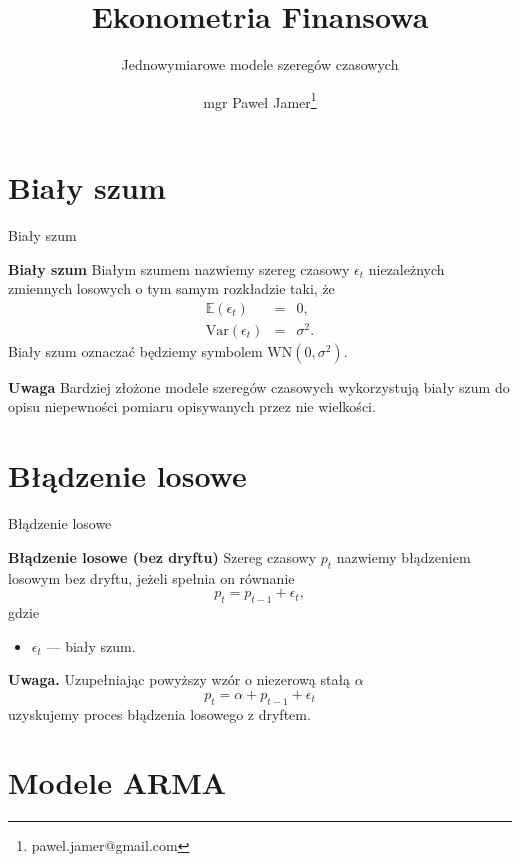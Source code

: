 \documentclass[a4paper, 11pt]{beamer}
\title{Ekonometria Finansowa}
\subtitle{Jednowymiarowe modele szeregów czasowych}
\author{mgr Paweł Jamer\thanks{pawel.jamer@gmail.com}}
\begin{document}
	\begin{frame}
		\titlepage
	\end{frame}
	
	\section{Biały szum}
	
	\begin{frame}{Biały szum}
		\begin{block}{\textbf{Biały szum}}
			Białym szumem nazwiemy szereg czasowy $\epsilon_t$ niezależnych zmiennych losowych o tym samym rozkładzie taki, że \begin{eqnarray*}
				\mathbb{E}\left(\epsilon_t\right) & = & 0,\\
				\mbox{Var}\left(\epsilon_t\right) & = & \sigma^2.
			\end{eqnarray*} Biały szum oznaczać będziemy symbolem $\mbox{WN}\left(0, \sigma^2\right)$.
		\end{block}
		\begin{alert}{\textbf{Uwaga}}
			Bardziej złożone modele szeregów czasowych wykorzystują biały szum do opisu niepewności pomiaru opisywanych przez nie wielkości.
		\end{alert}
	\end{frame}
	
	\section{Błądzenie losowe}
	
	\begin{frame}{Błądzenie losowe}
		\begin{block}{\textbf{Błądzenie losowe (bez dryftu)}}
			Szereg czasowy $p_t$ nazwiemy błądzeniem losowym bez dryftu, jeżeli spełnia on równanie \[
				p_t = p_{t-1} + \epsilon_t,
			\] gdzie
			\begin{itemize}
				\item $\epsilon_t$ --- biały szum.
			\end{itemize}
		\end{block}
		\begin{alert}{\textbf{Uwaga.}}
			Uzupełniając powyższy wzór o niezerową stałą $\alpha$ \[
				p_t = \alpha + p_{t-1} + \epsilon_t
			\] uzyskujemy proces błądzenia losowego z dryftem.
		\end{alert}
	\end{frame}
	
	\section{Modele ARMA}
\end{document}
